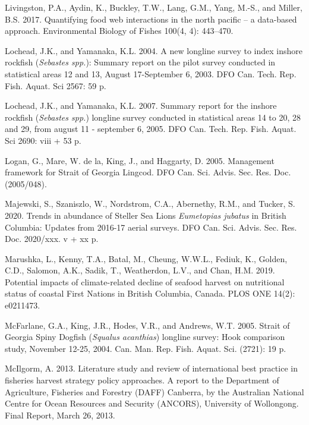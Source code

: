 \documentclass[11pt]{book}
\begin{document}
\leavevmode\hypertarget{ref-livingston2017}{}%
Livingston, P.A., Aydin, K., Buckley, T.W., Lang, G.M., Yang, M.-S., and Miller, B.S. 2017. Quantifying food web interactions in the north pacific -- a data-based approach. Environmental Biology of Fishes 100(4, 4): 443--470.

\leavevmode\hypertarget{ref-lochead2004}{}%
Lochead, J.K., and Yamanaka, K.L. 2004. A new longline survey to index inshore rockfish (\emph{Sebastes spp.}): Summary report on the pilot survey conducted in statistical areas 12 and 13, August 17-September 6, 2003. DFO Can. Tech. Rep. Fish. Aquat. Sci 2567: 59 p.

\leavevmode\hypertarget{ref-lochead2007}{}%
Lochead, J.K., and Yamanaka, K.L. 2007. Summary report for the inshore rockfish (\emph{Sebastes spp.}) longline survey conducted in statistical areas 14 to 20, 28 and 29, from august 11 - september 6, 2005. DFO Can. Tech. Rep. Fish. Aquat. Sci 2690: viii + 53 p.

\leavevmode\hypertarget{ref-logan2005}{}%
Logan, G., Mare, W. de la, King, J., and Haggarty, D. 2005. Management framework for Strait of Georgia Lingcod. DFO Can. Sci. Advis. Sec. Res. Doc. (2005/048).

\leavevmode\hypertarget{ref-majewski2020}{}%
Majewski, S., Szaniszlo, W., Nordstrom, C.A., Abernethy, R.M., and Tucker, S. 2020. Trends in abundance of Steller Sea Lions \emph{Eumetopias jubatus} in British Columbia: Updates from 2016-17 aerial surveys. DFO Can. Sci. Advis. Sec. Res. Doc. 2020/xxx. v + xx p.

\leavevmode\hypertarget{ref-marushka2019}{}%
Marushka, L., Kenny, T.A., Batal, M., Cheung, W.W.L., Fediuk, K., Golden, C.D., Salomon, A.K., Sadik, T., Weatherdon, L.V., and Chan, H.M. 2019. Potential impacts of climate-related decline of seafood harvest on nutritional status of coastal First Nations in British Columbia, Canada. PLOS ONE 14(2): e0211473.

\leavevmode\hypertarget{ref-mcfarlane2005}{}%
McFarlane, G.A., King, J.R., Hodes, V.R., and Andrews, W.T. 2005. Strait of Georgia Spiny Dogfish (\emph{Squalus acanthias}) longline survey: Hook comparison study, November 12-25, 2004. Can. Man. Rep. Fish. Aquat. Sci. (2721): 19 p.

\leavevmode\hypertarget{ref-mcilgorm2013}{}%
McIlgorm, A. 2013. Literature study and review of international best practice in fisheries harvest strategy policy approaches. A report to the Department of Agriculture, Fisheries and Forestry (DAFF) Canberra, by the Australian National Centre for Ocean Resources and Security (ANCORS), University of Wollongong. Final Report, March 26, 2013.
\end{document}
